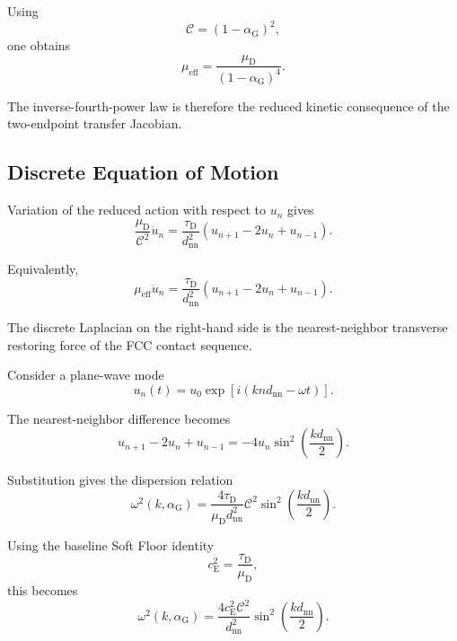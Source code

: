 Using
\begin{equation}
    \mathcal{C} = \left( 1-\alpha_{\mathrm{G}} \right)^2,
\end{equation}
one obtains
\begin{equation}
    \boxed{ \mu_{\mathrm{eff}} = \frac{\mu_{\mathrm{D}}}{ \left( 1-\alpha_{\mathrm{G}} \right)^4 } }.
\end{equation}

The inverse-fourth-power law is therefore the reduced kinetic consequence of the two-endpoint transfer Jacobian.

\subsection{Discrete Equation of Motion}

Variation of the reduced action with respect to $u_n$ gives
\begin{equation}
    \frac{\mu_{\mathrm{D}}}{\mathcal{C}^2}\ddot{u}_n = \frac{\tau_{\mathrm{D}}}{d_{\mathrm{nn}}^2} \left( u_{n+1} - 2u_n + u_{n-1} \right).
\end{equation}

Equivalently,
\begin{equation}
    \boxed{ \mu_{\mathrm{eff}}\ddot{u}_n = \frac{\tau_{\mathrm{D}}}{d_{\mathrm{nn}}^2} \left( u_{n+1} - 2u_n + u_{n-1} \right) }.
\end{equation}

The discrete Laplacian on the right-hand side is the nearest-neighbor transverse restoring force of the FCC contact sequence.

Consider a plane-wave mode
\begin{equation}
    u_n(t) = u_0 \exp \left[ i \left( knd_{\mathrm{nn}} - \omega t \right) \right].
\end{equation}

The nearest-neighbor difference becomes
\begin{equation}
    u_{n+1}-2u_n+u_{n-1} = -4u_n \sin^2 \left( \frac{kd_{\mathrm{nn}}}{2} \right).
\end{equation}

Substitution gives the dispersion relation
\begin{equation}
    \boxed{ \omega^2(k,\alpha_{\mathrm{G}}) = \frac{4\tau_{\mathrm{D}}}{\mu_{\mathrm{D}}d_{\mathrm{nn}}^2} \mathcal{C}^2 \sin^2 \left( \frac{kd_{\mathrm{nn}}}{2} \right) }.
\end{equation}

Using the baseline Soft Floor identity
\begin{equation}
    c_{\mathrm{E}}^2 = \frac{\tau_{\mathrm{D}}}{\mu_{\mathrm{D}}},
\end{equation}
this becomes
\begin{equation}
    \boxed{ \omega^2(k,\alpha_{\mathrm{G}}) = \frac{4c_{\mathrm{E}}^2\mathcal{C}^2}{d_{\mathrm{nn}}^2} \sin^2 \left( \frac{kd_{\mathrm{nn}}}{2} \right) }.
\end{equation}

